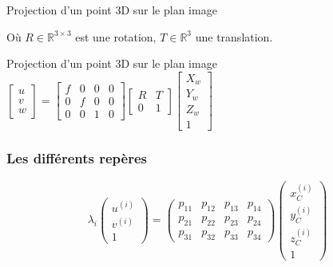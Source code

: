 \begin{frame}{Projection d’un point 3D sur le plan image}
\begin{minipage}[c]{0.48\linewidth}
\begin{overlayarea}{\linewidth}{5cm}
{      Où $R \in \mathbb{R}^{3\times3}$ est une rotation, $T \in \mathbb{R}^3$ une translation.
    }
  \end{overlayarea}
\end{minipage}
\hfill
\begin{minipage}[c]{0.48\linewidth}
  \centering
  \begin{overlayarea}{0.9\linewidth}{4cm}
    \hspace*{-1cm}
    \begin{tikzpicture}[x=0.75pt,y=0.75pt,yscale=-1,xscale=1, scale=0.6]
      
    \end{tikzpicture}
  \end{overlayarea}
\end{minipage}
\end{frame}


\begin{frame}{Projection d’un point 3D sur le plan image}
  \centering
    $\displaystyle
    \begin{bmatrix}
    u \\ v \\ w
    \end{bmatrix}
    =
    \begin{bmatrix}
    f & 0 & 0 & 0 \\
    0 & f & 0 & 0 \\
    0 & 0 & 1 & 0
    \end{bmatrix}
    \begin{bmatrix}
    R & T \\
    0 & 1
    \end{bmatrix}
    \begin{bmatrix}
    X_w \\ Y_w \\ Z_w \\ 1
    \end{bmatrix}
    $
\end{frame}

\begin{frame}
\frametitle{Les différents repères}

\[
\lambda_i 
\begin{pmatrix}
u^{(i)} \\
v^{(i)} \\
1
\end{pmatrix}
=
\begin{pmatrix}
p_{11} & p_{12} & p_{13} & p_{14} \\
p_{21} & p_{22} & p_{23} & p_{24} \\
p_{31} & p_{32} & p_{33} & p_{34}
\end{pmatrix}
\begin{pmatrix}
x_C^{(i)} \\
y_C^{(i)} \\
z_C^{(i)} \\
1
\end{pmatrix}
\]
\end{frame}


